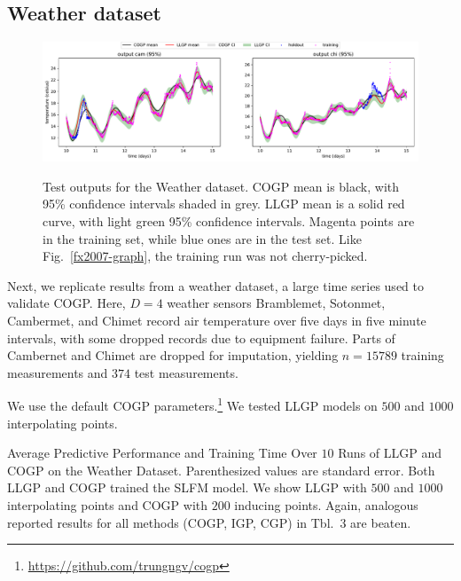 \documentclass[twoside]{article}
\begin{document}
\subsection{Weather dataset}\label{large-bench}


\begin{figure}[!ht]
\centering
{\includegraphics[width=\textwidth]{weather.pdf}}
\caption{Test outputs for the Weather dataset. COGP mean is black, with 95\% confidence intervals shaded in grey. LLGP mean is a solid red curve, with light green 95\% confidence intervals. Magenta points are in the training set, while blue ones are in the test set. Like Fig.~\ref{fx2007-graph}, the training run was not cherry-picked.}
\label{weather-fig}
\end{figure}

Next, we replicate results from a weather dataset, a large time series used to validate COGP. Here, $D=4$ weather sensors Bramblemet, Sotonmet, Cambermet, and Chimet record air temperature over five days in five minute intervals, with some dropped records due to equipment failure. Parts of Cambernet and Chimet are dropped for imputation, yielding $n=15789$ training measurements and $374$ test measurements. 

We use the default COGP parameters.\footnote{\url{https://github.com/trungngv/cogp}} We tested LLGP models on $500$ and $1000$ interpolating points.

\begin{table}[!htbp]
  \caption{Average Predictive Performance and Training Time Over $10$ Runs of LLGP and COGP on the Weather Dataset. Parenthesized values are standard error. Both LLGP and COGP trained the SLFM model. We show LLGP with $500$ and $1000$ interpolating points and COGP with $200$ inducing points. Again, analogous reported results for all methods (COGP, IGP, CGP) in \cite{nguyen2014collaborative} Tbl.~3 are beaten.}
\label{weather-tbl}
\begin{center}
  \begin{small}
    \begin{sc}
      
\end{sc}
\end{small}
\end{center}

\end{table}
\end{document}
